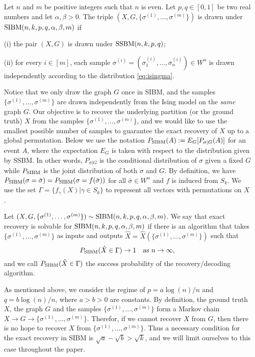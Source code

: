 \documentclass{article}
\begin{document}
\begin{definition}
Let $n$ and $m$ be positive integers such that $n$ is even. Let $p,q\in[0,1]$ be two real numbers and let $\alpha,\beta>0$. The triple $(X,G,\{\sigma^{(1)},\dots,\sigma^{(m)}\})$ is drawn under $\operatorname{SIBM}(n,k, p,q,\alpha,\beta,m)$ if

\noindent
(i) the pair $(X,G)$ is drawn under $\operatorname{SSBM}(n,k, p,q)$;

\noindent
(ii) for every $i\in[m]$, each sample $\sigma^{(i)}=(\sigma_1^{(i)},\dots,\sigma_n^{(i)}) \in W^n$ is drawn independently according to the distribution \eqref{eq:isingma}.
\end{definition}

Notice that we only draw the graph $G$ once in SIBM, and the samples $\{\sigma^{(1)},\dots,\sigma^{(m)}\}$ are drawn independently from the Ising model on the {\em same} graph $G$.
Our objective is to recover the underlying partition (or the ground truth) $X$ from the samples $\{\sigma^{(1)},\dots,\sigma^{(m)}\}$, and we would like to use the smallest possible number of samples to guarantee the exact recovery of $X$ up to a global permutation.
Below we use the notation $P_{\operatorname{SIBM}}(A):=E_G[P_{\sigma|G}(A)]$ for an event $A$, where the expectation $E_G$ is taken with respect to the distribution given by SSBM. In other words, $P_{\sigma|G}$ is the conditional distribution of  $\sigma$ given a fixed $G$ while $P_{\operatorname{SIBM}}$ is the joint distribution of both $\sigma$ and $G$.
By definition, we have $P_{\operatorname{SIBM}}(\sigma=\bar{\sigma})=P_{\operatorname{SIBM}}(\sigma=f(\bar{\sigma}))$ for all $\bar{\sigma}\in W^n$ and $f$ is induced from $S_k$. We use the set $\Gamma = \{f_{\gamma}(X) | \gamma \in S_k\}$ to
represent all vectors with permutations on $X$.

\begin{definition}
Let $(X,G,\{\sigma^{(1)},\dots,\sigma^{(m)}\}) \sim \operatorname{SIBM}(n,k, p,q,\alpha,\beta,m)$.
We say that exact recovery is solvable for $\operatorname{SIBM}(n,k,p,q,\alpha,\beta,m)$ if there is an algorithm that takes $\{\sigma^{(1)},\dots,\sigma^{(m)}\}$ as inputs and outputs $\hat{X}=\hat{X}(\{\sigma^{(1)},\dots,\sigma^{(m)}\})$ such that
$$
P_{\operatorname{SIBM}}(\hat{X} \in \Gamma) \to 1
\text{~~~as~} n\to\infty ,
$$
and we call $P_{\operatorname{SIBM}}(\hat{X} \in \Gamma)$ the success probability of the recovery/decoding algorithm.
\end{definition}


As mentioned above, we consider the regime of $p=a\log(n)/n$ and $q=b\log(n)/n$, where $a>b> 0$ are constants. By definition, the ground truth $X$, the graph $G$ and the samples $\{\sigma^{(1)},\dots,\sigma^{(m)}\}$ form a Markov chain $X\to G\to \{\sigma^{(1)},\dots,\sigma^{(m)}\}$. Therefor, if we cannot recover $X$ from $G$, then there is no hope to recover $X$ from $\{\sigma^{(1)},\dots,\sigma^{(m)}\}$. Thus a necessary condition for the exact recovery in SIBM is $\sqrt{a}-\sqrt{b}> \sqrt{k}$, and we will limit ourselves to this case throughout the paper.
\end{document}
